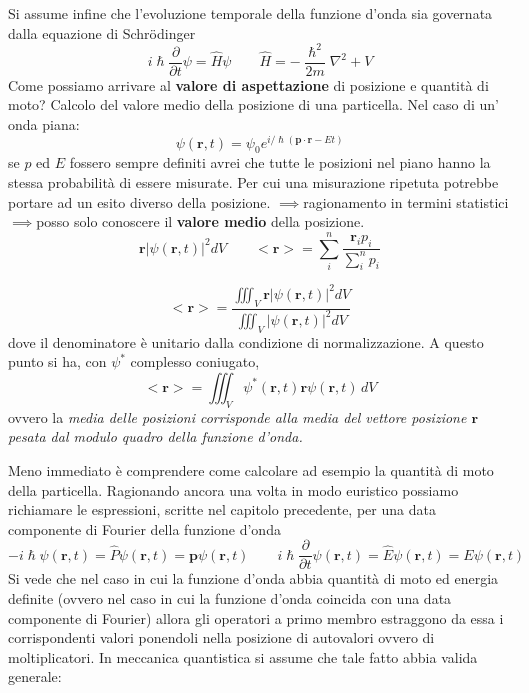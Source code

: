 Si assume infine che l'evoluzione temporale della funzione d'onda sia
governata dalla equazione di Schrödinger \[
                                             i \hslash \frac{\partial}{\partial t} \psi = \hat{H} \psi \qquad \hat{H} = - \frac{\hslash^{2}}{2m} \nabla^{2} + V
\] Come possiamo arrivare al \textbf{valore di aspettazione} di
posizione e quantità di moto?
Calcolo del valore medio della posizione
di una particella.
Nel caso di un' onda piana: \[
                                                   \psi(\bm{r},t) = \psi_{0} e^{ i/\hslash (\bm{p} \cdot \bm{r}-Et) }
\] se \(p\) ed \(E\) fossero sempre definiti avrei che tutte le
posizioni nel piano hanno la stessa probabilità di essere misurate.
Per
cui una misurazione ripetuta potrebbe portare ad un esito diverso della
posizione. \(\implies\)ragionamento in termini
statistici\(\implies\)posso solo conoscere il \textbf{valore medio}
della posizione. \[
                     \bm{r} |\psi(\bm{r},t)|^{2}dV \qquad <\bm{r}> = \sum_{i}^{n} \frac{\bm{r}_{i}p_{i}}{\sum_{i}^{n}p_{i}}
\]

\begin{equation}
<\bm{r}> = \frac{\iiint_{V} \bm{r} |\psi(\bm{r},t)|^{2}dV }{\iiint_{V}|\psi(\bm{r},t)|^{2}dV }
\end{equation} dove il denominatore è unitario dalla condizione di
normalizzazione.
A questo punto si ha, con \(\psi^*\) complesso
coniugato, \[
               <\bm{r}> = \iiint_{V} \psi^*(\bm{r},t)\bm{r}\psi(\bm{r},t)\,dV
\] ovvero la \emph{media delle posizioni corrisponde alla media del
vettore posizione \(\bm{r}\) pesata dal modulo quadro della funzione
d'onda.}

Meno immediato è comprendere come calcolare ad esempio la quantità di
moto della particella.
Ragionando ancora una volta in modo euristico
possiamo richiamare le espressioni, scritte nel capitolo precedente, per
una data componente di Fourier della funzione d'onda \[
                                                         - i \hslash \psi(\bm{r},t) = \hat{P} \psi(\bm{r},t) = \bm{p} \psi(\bm{r},t) \qquad
                                                         i \hslash \frac{\partial}{\partial t} \psi(\bm{r},t) = \hat{E}\psi(\bm{r},t)= E\psi(\bm{r},t)
\] Si vede che nel caso in cui la funzione d'onda abbia quantità di moto
ed energia definite (ovvero nel caso in cui la funzione d'onda coincida
con una data componente di Fourier) allora gli operatori a primo membro
estraggono da essa i corrispondenti valori ponendoli nella posizione di
autovalori ovvero di moltiplicatori.
In meccanica quantistica si assume
che tale fatto abbia valida generale:

